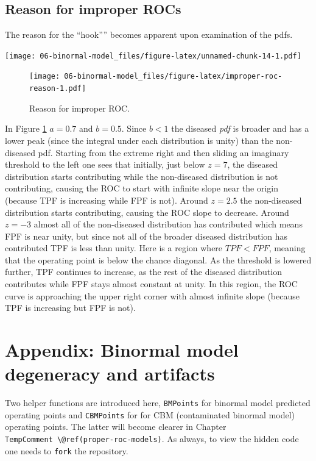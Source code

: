 \documentclass[
]{book}
\begin{document}
\hypertarget{reason-for-improper-rocs}{%
\subsection{Reason for improper ROCs}\label{reason-for-improper-rocs}}

The reason for the ``hook'''' becomes apparent upon examination of the pdfs.

\texttt{[image: 06-binormal-model\_files/figure-latex/unnamed-chunk-14-1.pdf]}

\begin{figure}
\centering
\texttt{[image: 06-binormal-model\_files/figure-latex/improper-roc-reason-1.pdf]}
\caption{\label{fig:improper-roc-reason}Reason for improper ROC.}
\end{figure}

In Figure \ref{fig:improper-roc-reason} \(a = 0.7\) and \(b = 0.5\). Since \(b < 1\) the diseased \emph{pdf} is broader and has a lower peak (since the integral under each distribution is unity) than the non-diseased pdf. Starting from the extreme right and then sliding an imaginary threshold to the left one sees that initially, just below \(z = 7\), the diseased distribution starts contributing while the non-diseased distribution is not contributing, causing the ROC to start with infinite slope near the origin (because TPF is increasing while FPF is not). Around \(z = 2.5\) the non-diseased distribution starts contributing, causing the ROC slope to decrease. Around \(z = -3\) almost all of the non-diseased distribution has contributed which means FPF is near unity, but since not all of the broader diseased distribution has contributed TPF is less than unity. Here is a region where \(TPF < FPF\), meaning that the operating point is below the chance diagonal. As the threshold is lowered further, TPF continues to increase, as the rest of the diseased distribution contributes while FPF stays almost constant at unity. In this region, the ROC curve is approaching the upper right corner with almost infinite slope (because TPF is increasing but FPF is not).

\hypertarget{binormal-model-degeneracy-artifacts}{%
\section{Appendix: Binormal model degeneracy and artifacts}\label{binormal-model-degeneracy-artifacts}}

Two helper functions are introduced here, \texttt{BMPoints} for binormal model predicted operating points and \texttt{CBMPoints} for for CBM (contaminated binormal model) operating points. The latter will become clearer in Chapter \texttt{TempComment\ \textbackslash{}@ref(proper-roc-models)}. As always, to view the hidden code one needs to \texttt{fork} the repository.
\end{document}
